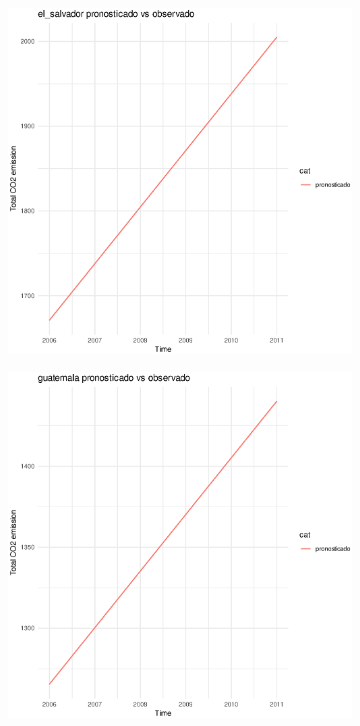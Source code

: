 \documentclass[twocolumn]{article}
\begin{document}
\begin{figure}
\begin{subfigure}{.3\textwidth}
        \end{subfigure}
        \hspace*{\fill}
        \begin{subfigure}{.3\textwidth}
            \includegraphics[width=\linewidth]{images/el_salvador_imputation.eps}
        \end{subfigure}
        \hspace*{\fill}
        \begin{subfigure}{.3\textwidth}
            \includegraphics[width=\linewidth]{images/guatemala_imputation.eps}
        \end{subfigure}\\      
        

\end{figure}
\end{document}
